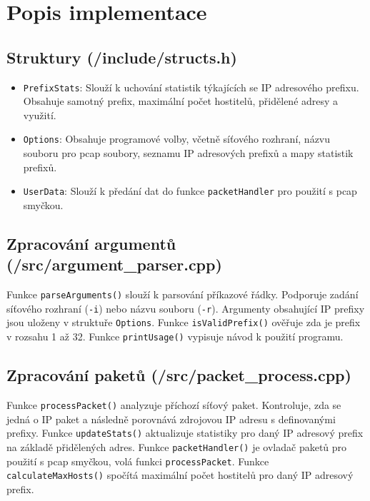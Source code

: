 \documentclass[a4paper, 11pt]{article}
\begin{document}
    \section{Popis implementace}

    \subsection{Struktury   (/include/structs.h)}
    \begin{itemize}
        \item \texttt{PrefixStats}: Slouží k uchování statistik týkajících se IP adresového prefixu. Obsahuje samotný prefix, maximální počet hostitelů, přidělené adresy a využití.
        \item \texttt{Options}: Obsahuje programové volby, včetně síťového rozhraní, názvu souboru pro pcap soubory, seznamu IP adresových prefixů a mapy statistik prefixů.
        \item \texttt{UserData}: Slouží k předání dat do funkce \texttt{packetHandler} pro použití s pcap smyčkou.
    \end{itemize}

    \subsection{Zpracování argumentů (/src/argument\_parser.cpp)}

    Funkce \texttt{parseArguments()} slouží k parsování příkazové řádky. Podporuje zadání síťového rozhraní (\texttt{-i}) nebo názvu souboru (\texttt{-r}). Argumenty obsahující IP prefixy jsou uloženy v struktuře \texttt{Options}. Funkce \texttt{isValidPrefix()} ověřuje zda je prefix v rozsahu 1 až 32. Funkce \texttt{printUsage()} vypisuje návod k použití programu.

    \subsection{Zpracování paketů (/src/packet\_process.cpp)}

    Funkce \texttt{processPacket()} analyzuje příchozí síťový paket. Kontroluje, zda se jedná o IP paket a následně porovnává zdrojovou IP adresu s definovanými prefixy. Funkce \texttt{updateStats()} aktualizuje statistiky pro daný IP adresový prefix na základě přidělených adres. Funkce \texttt{packetHandler()} je ovladač paketů pro použití s pcap smyčkou, volá funkci \texttt{processPacket}. Funkce \texttt{calculateMaxHosts()} spočítá maximální počet hostitelů pro daný IP adresový prefix.
\end{document}
